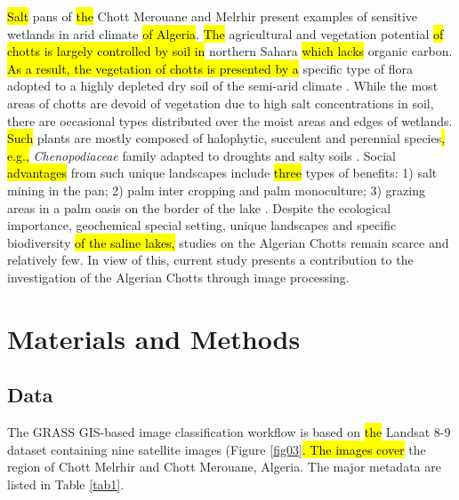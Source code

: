 \documentclass[asi,article,submit,pdftex,moreauthors]{Definitions/mdpi}
\begin{document}
\hl{Salt }pans of \hl{the }Chott Merouane and Melrhir\hl{ }present examples of sensitive wetlands in\hl{ }arid climate \hl{of Algeria}. \hl{The} agricultural and vegetation potential \hl{of chotts is largely controlled by soil in} northern Sahara \hl{which lacks} organic carbon. \hl{As a result, the vegetation of chotts is presented by a} specific type\hl{ }of flora adopted to a highly depleted dry soil of the semi-arid climate \cite{BOUBEHZIZ2020104539}. While the most areas of chotts are devoid of vegetation due to high salt concentrations in soil, there are\hl{ }occasional\hl{ }types distributed over the moist areas and edges of\hl{ }wetlands. \hl{Such} plants are mostly composed of halophytic, succulent and perennial species\hl{, e.g.,} \emph{Chenopodiaceae} family adapted to droughts and salty soils \cite{KHAZNADAR2009369}. Social \hl{advantages} from such unique landscapes include \hl{three} types of benefits: 1) salt mining in the pan; 2) palm inter cropping and palm monoculture; 3) grazing areas in a palm oasis on the border of the lake \cite{Demnati2012}. Despite the ecological importance, geochemical special setting, unique landscapes\hl{ }and\hl{ }specific biodiversity \hl{of the saline lakes, }studies on the Algerian Chotts remain scarce and relatively few. In view of this, current study presents a contribution to the investigation of the Algerian Chotts through\hl{ }image processing. 

\section{Materials and Methods}

\subsection{Data}

The GRASS GIS-based image classification workflow is based on \hl{the} Landsat 8-9 dataset containing nine satellite images (Figure \ref{fig03}\hl{. The images cover} the region of Chott Melrhir and Chott Merouane, Algeria. The major metadata are listed in Table \ref{tab1}. 
\end{document}
